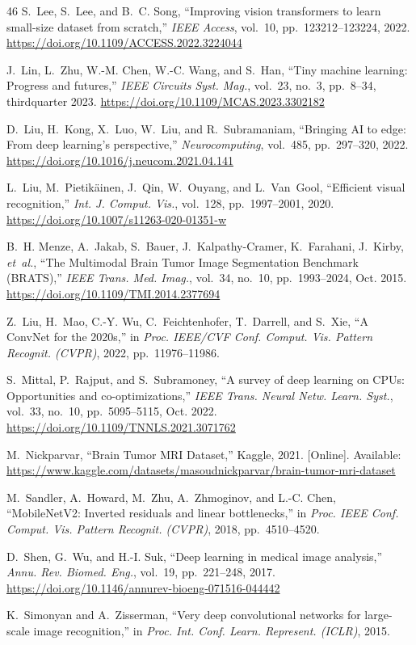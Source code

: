 \documentclass[journal]{IEEEtran}
\providecommand{\doi}[1]{\url{https://doi.org/#1}}
\begin{document}
\begin{thebibliography}{46}
S.~Lee, S.~Lee, and B.~C. Song, ``Improving vision transformers to learn small-size dataset from scratch,'' \emph{IEEE Access}, vol.~10, pp.~123212--123224, 2022. \doi{10.1109/ACCESS.2022.3224044}

J.~Lin, L.~Zhu, W.-M. Chen, W.-C. Wang, and S.~Han, ``Tiny machine learning: Progress and futures,'' \emph{IEEE Circuits Syst. Mag.}, vol.~23, no.~3, pp.~8--34, thirdquarter 2023. \doi{10.1109/MCAS.2023.3302182}

D.~Liu, H.~Kong, X.~Luo, W.~Liu, and R.~Subramaniam, ``Bringing AI to edge: From deep learning's perspective,'' \emph{Neurocomputing}, vol.~485, pp.~297--320, 2022. \doi{10.1016/j.neucom.2021.04.141}

L.~Liu, M.~Pietik{\"a}inen, J.~Qin, W.~Ouyang, and L.~Van~Gool, ``Efficient visual recognition,'' \emph{Int. J. Comput. Vis.}, vol.~128, pp.~1997--2001, 2020. \doi{10.1007/s11263-020-01351-w}

B.~H. Menze, A.~Jakab, S.~Bauer, J.~Kalpathy-Cramer, K.~Farahani, J.~Kirby, \emph{et~al.}, ``The Multimodal Brain Tumor Image Segmentation Benchmark (BRATS),'' \emph{IEEE Trans. Med. Imag.}, vol.~34, no.~10, pp.~1993--2024, Oct. 2015. \doi{10.1109/TMI.2014.2377694}

Z.~Liu, H.~Mao, C.-Y. Wu, C.~Feichtenhofer, T.~Darrell, and S.~Xie, ``A ConvNet for the 2020s,'' in \emph{Proc. IEEE/CVF Conf. Comput. Vis. Pattern Recognit. (CVPR)}, 2022, pp.~11976--11986.

S.~Mittal, P.~Rajput, and S.~Subramoney, ``A survey of deep learning on CPUs: Opportunities and co-optimizations,'' \emph{IEEE Trans. Neural Netw. Learn. Syst.}, vol.~33, no.~10, pp.~5095--5115, Oct. 2022. \doi{10.1109/TNNLS.2021.3071762}

M.~Nickparvar, ``Brain Tumor MRI Dataset,'' Kaggle, 2021. [Online]. Available: \url{https://www.kaggle.com/datasets/masoudnickparvar/brain-tumor-mri-dataset}

M.~Sandler, A.~Howard, M.~Zhu, A.~Zhmoginov, and L.-C. Chen, ``MobileNetV2: Inverted residuals and linear bottlenecks,'' in \emph{Proc. IEEE Conf. Comput. Vis. Pattern Recognit. (CVPR)}, 2018, pp.~4510--4520.

D.~Shen, G.~Wu, and H.-I. Suk, ``Deep learning in medical image analysis,'' \emph{Annu. Rev. Biomed. Eng.}, vol.~19, pp.~221--248, 2017. \doi{10.1146/annurev-bioeng-071516-044442}

K.~Simonyan and A.~Zisserman, ``Very deep convolutional networks for large-scale image recognition,'' in \emph{Proc. Int. Conf. Learn. Represent. (ICLR)}, 2015.


\end{thebibliography}
\end{document}
